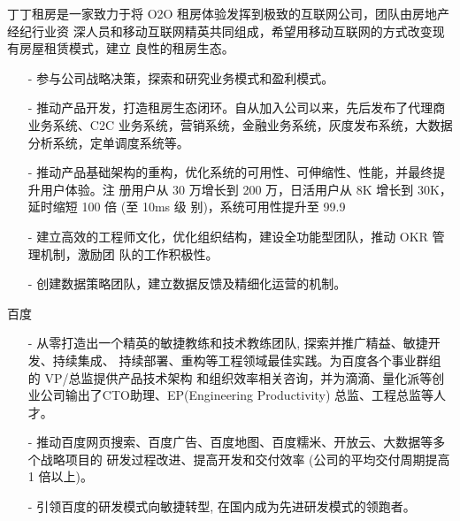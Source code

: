 \documentclass[11pt,a4paper]{moderncv}
\begin{document}
\vspace{1ex}  
{
	丁丁租房是一家致力于将 O2O 租房体验发挥到极致的互联网公司，团队由房地产经纪行业资 深人员和移动互联网精英共同组成，希望用移动互联网的方式改变现有房屋租赁模式，建立 良性的租房生态。
	\vspace{1ex}
	\begin{itemize}  
		\item[-] 参与公司战略决策，探索和研究业务模式和盈利模式。
		\vspace{1ex}  
		\item[-] 推动产品开发，打造租房生态闭环。自从加入公司以来，先后发布了代理商业务系统、C2C
业务系统，营销系统，金融业务系统，灰度发布系统，大数据分析系统，定单调度系统等。
		\vspace{1ex}  
		\item[-] 推动产品基础架构的重构，优化系统的可用性、可伸缩性、性能，并最终提升用户体验。注 册用户从 30 万增长到 200 万，日活用户从 8K 增长到 30K，延时缩短 100 倍 (至 10ms 级 别)，系统可用性提升至 99.9%
		\vspace{1ex}  
		\item[-] 建立高效的工程师文化，优化组织结构，建设全功能型团队，推动 OKR 管理机制，激励团 队的工作积极性。
		\vspace{1ex}  
		\item[-] 创建数据策略团队，建立数据反馈及精细化运营的机制。
	\end{itemize}
}

\pagebreak

	{百度}{}{}{}{}
	
\vspace{1ex}  
{
\vspace{1ex}
  \begin{itemize}  
    \item[-] 从零打造出一个精英的敏捷教练和技术教练团队, 探索并推广精益、敏捷开发、持续集成、 持续部署、重构等工程领域最佳实践。为百度各个事业群组的 VP/总监提供产品技术架构 和组织效率相关咨询，并为滴滴、量化派等创业公司输出了CTO助理、EP(Engineering Productivity) 总监、工程总监等人才。
\vspace{1ex}  
    \item[-] 推动百度网页搜索、百度广告、百度地图、百度糯米、开放云、大数据等多个战略项目的 研发过程改进、提高开发和交付效率 (公司的平均交付周期提高 1 倍以上)。
\vspace{1ex}  
    \item[-] 引领百度的研发模式向敏捷转型, 在国内成为先进研发模式的领跑者。
  \end{itemize}
}
\end{document}
